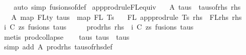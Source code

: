 \begin{isabellebody}
%
\isadelimproof
\ \ %
\endisadelimproof
%
\isatagproof
{}\isamarkupfalse%
\ {\isacharparenleft}{\kern0pt}auto\ simp{\isacharcolon}{\kern0pt}\ fusions{\isacharunderscore}{\kern0pt}of{\isacharunderscore}{\kern0pt}def{\isacharparenright}{\kern0pt}%
\endisatagproof
{\isafoldproof}%
%
\isadelimproof
\isanewline
%
\endisadelimproof
\isanewline
\isanewline
{}\isamarkupfalse%
\ app{\isacharunderscore}{\kern0pt}prodrule{\isacharunderscore}{\kern0pt}FL{\isacharunderscore}{\kern0pt}equiv{\isacharcolon}{\kern0pt}\isanewline
\ \ \ A{}{\isacharcolon}{\kern0pt}\ {\isachardoublequoteopen}taus\ {\isacharequal}{\kern0pt}\ taus{\isacharunderscore}{\kern0pt}of{\isacharunderscore}{\kern0pt}rhs\ rhs{\isachardoublequoteclose}\isanewline
\ \ \ A{}{\isacharcolon}{\kern0pt}\ {\isachardoublequoteopen}map\ FLty\ taus\ {\isacharequal}{\kern0pt}\ map\ FL\ Ts{\isachardoublequoteclose}\isanewline
\ \ \ {\isachardoublequoteopen}FL\ {\isacharparenleft}{\kern0pt}app{\isacharunderscore}{\kern0pt}prodrule\ Ts\ rhs{\isacharparenright}{\kern0pt}\ {\isacharequal}{\kern0pt}\ FLrhs\ rhs{\isachardoublequoteclose}\isanewline
%
\isadelimproof
%
\endisadelimproof
%
\isatagproof
{}\isamarkupfalse%
\ {\isacharminus}{\kern0pt}\isanewline
\ \ \isamarkupfalse%
\ i\ C\ zs\ fusions\ taus{\isacharprime}{\kern0pt}\ \isanewline
\ \ \ \ prod{\isacharunderscore}{\kern0pt}rhs{\isacharcolon}{\kern0pt}\ {\isachardoublequoteopen}rhs\ {\isacharequal}{\kern0pt}\ {\isacharparenleft}{\kern0pt}i{\isacharcomma}{\kern0pt}\ {\isacharparenleft}{\kern0pt}C{\isacharcomma}{\kern0pt}\ zs{\isacharparenright}{\kern0pt}{\isacharcomma}{\kern0pt}\ fusions{\isacharcomma}{\kern0pt}\ taus{\isacharprime}{\kern0pt}{\isacharparenright}{\kern0pt}{\isachardoublequoteclose}\isanewline
\ \ \ \isamarkupfalse%
\ {\isacharparenleft}{\kern0pt}metis\ prod{\isachardot}{\kern0pt}collapse{\isacharparenright}{\kern0pt}\isanewline
\isanewline
\ \ \isamarkupfalse%
\ taus{\isacharcolon}{\kern0pt}\ {\isachardoublequoteopen}taus{\isacharprime}{\kern0pt}\ {\isacharequal}{\kern0pt}\ taus{\isachardoublequoteclose}\isanewline
\ \ \ \ \isamarkupfalse%
\ {\isacharparenleft}{\kern0pt}simp\ add{\isacharcolon}{\kern0pt}\ A{}\ prod{\isacharunderscore}{\kern0pt}rhs\ taus{\isacharunderscore}{\kern0pt}of{\isacharunderscore}{\kern0pt}rhs{\isacharunderscore}{\kern0pt}def{\isacharparenright}{\kern0pt}\isanewline
\ \ \isamarkupfalse%

\end{isabellebody}
